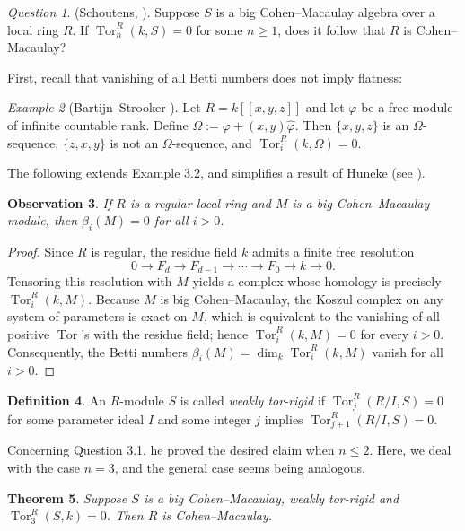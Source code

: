 \documentclass[11pt,a4paper]{amsart}
\numberwithin{equation}{section}
\newtheorem{theorem}{Theorem}[section]
\newtheorem{observation}[theorem]{Observation}
\theoremstyle{definition}
\newtheorem{definition}[theorem]{Definition}
\theoremstyle{remark}
\newtheorem{example}[theorem]{Example}
\newtheorem{question}[theorem]{Question}\newtheorem{discussion}[theorem]{Discussion}
\begin{document}
\begin{question}(Schoutens, \cite[End of \S 2]{sc1}).
	Suppose \(S\) is a big Cohen--Macaulay algebra over a local ring \(R\). If \(\operatorname{Tor}_n^R(k,S)=0\) for some \(n\ge 1\), does it follow that \(R\) is Cohen--Macaulay?
\end{question}First, recall that vanishing of all Betti numbers does not imply flatness:
\begin{example}[Bartijn--Strooker \cite{BS}]
	Let \(R = k[[x,y,z]]\) and let \(\varphi\) be a free module of infinite countable rank. Define \(\Omega := \varphi + (x,y)\widehat{\varphi}\). Then \(\{x,y,z\}\) is an \(\Omega\)-sequence, \(\{z,x,y\}\) is not an \(\Omega\)-sequence, and \(\operatorname{Tor}_i^R(k,\Omega)=0\).  
\end{example}
The following extends Example 3.2, and simplifies a result of Huneke (see \cite[9.1]{Hun}).

\begin{observation}\label{3.3}
	If \(R\) is a regular local ring and \(M\) is a big Cohen--Macaulay module, then \(\beta_i(M)=0\) for all \(i>0\).
\end{observation}

\begin{proof}
	Since \(R\) is regular, the residue field \(k\) admits a finite free resolution
	\[
	0 \longrightarrow F_d \longrightarrow F_{d-1} \longrightarrow \cdots \longrightarrow F_0 \longrightarrow k \longrightarrow 0.
	\]
	Tensoring this resolution with \(M\) yields a complex whose homology is precisely \(\operatorname{Tor}_i^R(k,M)\). Because \(M\) is big Cohen--Macaulay, the Koszul complex on any system of parameters is exact on \(M\), which is equivalent to the vanishing of all positive \(\operatorname{Tor}\)'s with the residue field; hence \(\operatorname{Tor}_i^R(k,M)=0\) for every \(i>0\). Consequently, the Betti numbers \(\beta_i(M)=\dim_k \operatorname{Tor}_i^R(k,M)\) vanish for all \(i>0\).
\end{proof}

\begin{definition}
	An \(R\)-module \(S\) is called \emph{weakly tor-rigid} if \(\operatorname{Tor}_j^R(R/I,S)=0\) for some parameter ideal \(I\) and some integer \(j\) implies \(\operatorname{Tor}_{j+1}^R(R/I,S)=0\).
\end{definition}
Concerning Question 3.1, he proved the desired claim when $n\leq 2$. Here, we deal with the case \(n=3\), and the general case seems being analogous.
\begin{theorem}
Suppose \(S\) is a big Cohen--Macaulay, weakly tor-rigid and  \(\operatorname{Tor}_3^R(S,k)=0\).   Then \(R\) is Cohen--Macaulay.
\end{theorem}
\end{document}
